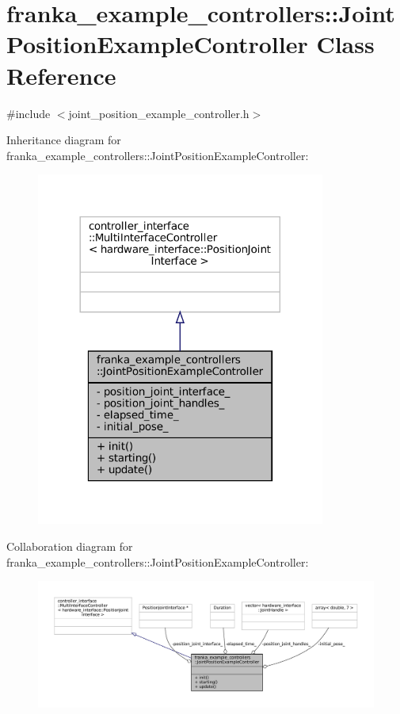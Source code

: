 \hypertarget{classfranka__example__controllers_1_1JointPositionExampleController}{}\section{franka\+\_\+example\+\_\+controllers\+:\+:Joint\+Position\+Example\+Controller Class Reference}
\label{classfranka__example__controllers_1_1JointPositionExampleController}


{\ttfamily \#include $<$joint\+\_\+position\+\_\+example\+\_\+controller.\+h$>$}



Inheritance diagram for franka\+\_\+example\+\_\+controllers\+:\+:Joint\+Position\+Example\+Controller\+:
\nopagebreak
\begin{figure}[H]
\begin{center}
\leavevmode
\includegraphics[width=269pt]{classfranka__example__controllers_1_1JointPositionExampleController__inherit__graph}
\end{center}
\end{figure}


Collaboration diagram for franka\+\_\+example\+\_\+controllers\+:\+:Joint\+Position\+Example\+Controller\+:
\nopagebreak
\begin{figure}[H]
\begin{center}
\leavevmode
\includegraphics[width=350pt]{classfranka__example__controllers_1_1JointPositionExampleController__coll__graph}
\end{center}
\end{figure}
